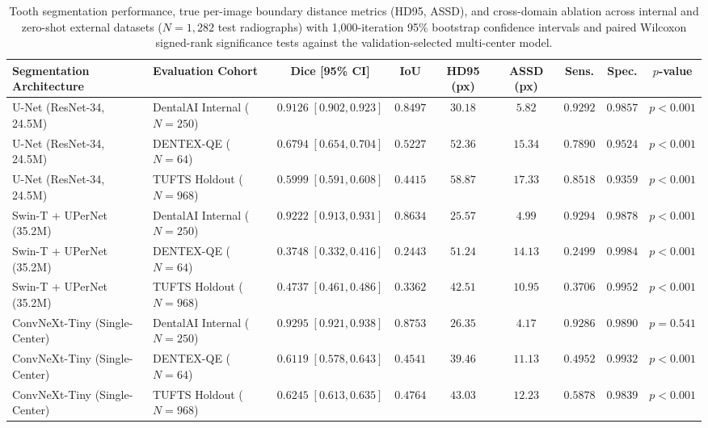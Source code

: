 \documentclass[review]{elsarticle}
\begin{document}
\begin{table}[t]
\centering
\caption{Tooth segmentation performance, true per-image boundary distance metrics (HD95, ASSD), and cross-domain ablation across internal and zero-shot external datasets ($N=1,282$ test radiographs) with 1,000-iteration 95\% bootstrap confidence intervals and paired Wilcoxon signed-rank significance tests against the validation-selected multi-center model.}
\label{tab:seg_metrics}
\begin{adjustbox}{width=\textwidth}
\begin{tabular}{llccccccc}
\toprule
\textbf{Segmentation Architecture} & \textbf{Evaluation Cohort} & \textbf{Dice [95\% CI]} & \textbf{IoU} & \textbf{HD95 (px)} & \textbf{ASSD (px)} & \textbf{Sens.} & \textbf{Spec.} & \textbf{$p$-value} \\
\midrule
U-Net (ResNet-34, 24.5M) & DentalAI Internal ($N=250$) & $0.9126\;[0.902, 0.923]$ & $0.8497$ & $30.18$ & $5.82$ & $0.9292$ & $0.9857$ & $p < 0.001$ \\
U-Net (ResNet-34, 24.5M) & DENTEX-QE ($N=64$) & $0.6794\;[0.654, 0.704]$ & $0.5227$ & $52.36$ & $15.34$ & $0.7890$ & $0.9524$ & $p < 0.001$ \\
U-Net (ResNet-34, 24.5M) & TUFTS Holdout ($N=968$) & $0.5999\;[0.591, 0.608]$ & $0.4415$ & $58.87$ & $17.33$ & $0.8518$ & $0.9359$ & $p < 0.001$ \\
\midrule
Swin-T + UPerNet (35.2M) & DentalAI Internal ($N=250$) & $0.9222\;[0.913, 0.931]$ & $0.8634$ & $\mathbf{25.57}$ & $4.99$ & $0.9294$ & $0.9878$ & $p < 0.001$ \\
Swin-T + UPerNet (35.2M) & DENTEX-QE ($N=64$) & $0.3748\;[0.332, 0.416]$ & $0.2443$ & $51.24$ & $14.13$ & $0.2499$ & $\mathbf{0.9984}$ & $p < 0.001$ \\
Swin-T + UPerNet (35.2M) & TUFTS Holdout ($N=968$) & $0.4737\;[0.461, 0.486]$ & $0.3362$ & $42.51$ & $10.95$ & $0.3706$ & $\mathbf{0.9952}$ & $p < 0.001$ \\
\midrule
ConvNeXt-Tiny (Single-Center) & DentalAI Internal ($N=250$) & $0.9295\;[0.921, 0.938]$ & $0.8753$ & $26.35$ & $\mathbf{4.17}$ & $0.9286$ & $\mathbf{0.9890}$ & $p = 0.541$ \\
ConvNeXt-Tiny (Single-Center) & DENTEX-QE ($N=64$) & $0.6119\;[0.578, 0.643]$ & $0.4541$ & $39.46$ & $11.13$ & $0.4952$ & $0.9932$ & $p < 0.001$ \\
ConvNeXt-Tiny (Single-Center) & TUFTS Holdout ($N=968$) & $0.6245\;[0.613, 0.635]$ & $0.4764$ & $43.03$ & $12.23$ & $0.5878$ & $0.9839$ & $p < 0.001$ \\

\end{tabular}
\end{adjustbox}
\end{table}
\end{document}
